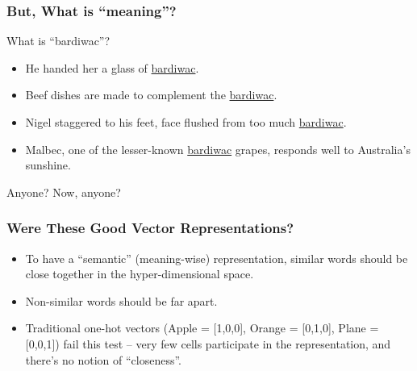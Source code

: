 \begin{frame}[fragile]\frametitle{But, What is ``meaning''?}
What is ``bardiwac''?

\begin{itemize}
\item He handed her a glass of \underline{bardiwac}.
\item Beef dishes are made to complement the \underline{bardiwac}.
\item Nigel staggered to his feet, face flushed from too much \underline{bardiwac}.
\item Malbec, one of the lesser-known \underline{bardiwac} grapes, responds well to Australia's sunshine.
\end{itemize}
Anyone? Now, anyone?
\end{frame}

%

\begin{frame}[fragile]\frametitle{Were These Good Vector Representations?}
	\begin{itemize}
	\item To have a ``semantic'' (meaning-wise) representation, similar words should be close together in the hyper-dimensional space.
	\item Non-similar words should be far apart.
	\item Traditional one-hot vectors (Apple = [1,0,0], Orange = [0,1,0], Plane = [0,0,1]) fail this test -- very few cells participate in the representation, and there's no notion of ``closeness''.
	\end{itemize}
\end{frame}

